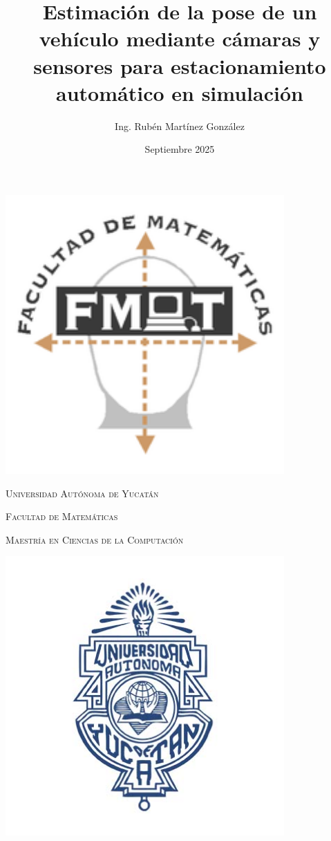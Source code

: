 \documentclass[10pt,letterpaper,final]{report}
\title{Estimación de la pose de un vehículo mediante cámaras y sensores para estacionamiento automático en simulación}
\author{Ing. Rubén Martínez González}
\date{Septiembre 2025}
\newcommand{\university}{Universidad Autónoma de Yucatán}
\newcommand{\faculty}{Facultad de Matemáticas}
\newcommand{\degree}{Maestría en Ciencias de la Computación}
\begin{document}
\begin{titlepage}
    \centering
    \begin{minipage}{0.25\textwidth}
        \centering
        \includegraphics[width=0.8\textwidth]{img/fmat.png}
    \end{minipage}%
    \hfill
    \begin{minipage}{0.5\textwidth}
        \centering
        {\scshape\small \university \par}
        \vspace{0.2cm}
        {\scshape\small \faculty \par}
        \vspace{0.2cm}
        {\scshape\small \degree \par}
    \end{minipage}%
    \hfill
    \begin{minipage}{0.25\textwidth}
        \centering
        \includegraphics[width=0.8\textwidth]{img/UADY.jpg}
    \end{minipage}


\end{titlepage}
\end{document}
